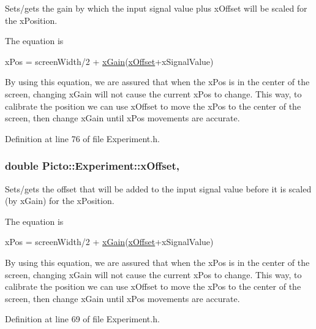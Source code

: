 Sets/gets the gain by which the input signal value plus x\-Offset will be scaled for the x\-Position. 

The equation is
\begin{DoxyCode}
xPos = screenWidth/2 + \hyperlink{class_picto_1_1_experiment_acd2fd30373eb8c9050be4de8541a1576}{xGain}(\hyperlink{class_picto_1_1_experiment_a0c8a2615fdcb36dc6ff76c572b718750}{xOffset}+xSignalValue) 
\end{DoxyCode}


By using this equation, we are assured that when the x\-Pos is in the center of the screen, changing x\-Gain will not cause the current x\-Pos to change. This way, to calibrate the position we can use x\-Offset to move the x\-Pos to the center of the screen, then change x\-Gain until x\-Pos movements are accurate. 

Definition at line 76 of file Experiment.\-h.

\hypertarget{class_picto_1_1_experiment_a0c8a2615fdcb36dc6ff76c572b718750}{
\subsubsection[{x\-Offset}]{\setlength{\rightskip}{0pt plus 5cm}double Picto\-::\-Experiment\-::x\-Offset\hspace{0.3cm}{\ttfamily [read]}, {\ttfamily [write]}}}\label{class_picto_1_1_experiment_a0c8a2615fdcb36dc6ff76c572b718750}


Sets/gets the offset that will be added to the input signal value before it is scaled (by x\-Gain) for the x\-Position. 

The equation is
\begin{DoxyCode}
xPos = screenWidth/2 + \hyperlink{class_picto_1_1_experiment_acd2fd30373eb8c9050be4de8541a1576}{xGain}(\hyperlink{class_picto_1_1_experiment_a0c8a2615fdcb36dc6ff76c572b718750}{xOffset}+xSignalValue) 
\end{DoxyCode}


By using this equation, we are assured that when the x\-Pos is in the center of the screen, changing x\-Gain will not cause the current x\-Pos to change. This way, to calibrate the position we can use x\-Offset to move the x\-Pos to the center of the screen, then change x\-Gain until x\-Pos movements are accurate. 

Definition at line 69 of file Experiment.\-h.

